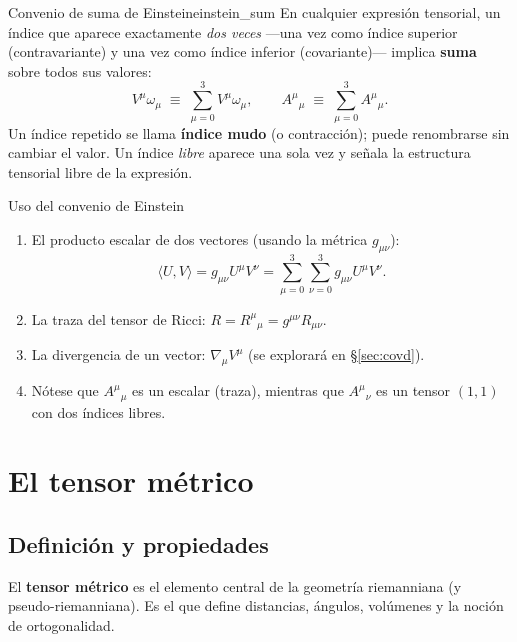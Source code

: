 \begin{definicion}{Convenio de suma de Einstein}{einstein_sum}
En cualquier expresión tensorial, un índice que aparece exactamente \emph{dos veces} ---una vez como índice superior (contravariante) y una vez como índice inferior (covariante)--- implica \textbf{suma} sobre todos sus valores:
\[
  V^\mu \omega_\mu \;\equiv\; \sum_{\mu=0}^{3} V^\mu \omega_\mu,
  \qquad
  A^\mu{}_{\mu} \;\equiv\; \sum_{\mu=0}^{3} A^\mu{}_\mu.
\]
Un índice repetido se llama \textbf{índice mudo} (o contracción); puede renombrarse sin cambiar el valor. Un índice \emph{libre} aparece una sola vez y señala la estructura tensorial libre de la expresión.
\end{definicion}

\begin{ejemplo}{Uso del convenio de Einstein}{}
\begin{enumerate}[leftmargin=2em, label=(\alph*)]
  \item El producto escalar de dos vectores (usando la métrica $g_{\mu\nu}$):
  \[
    \langle U, V\rangle = g_{\mu\nu} U^\mu V^\nu = \sum_{\mu=0}^{3}\sum_{\nu=0}^{3} g_{\mu\nu} U^\mu V^\nu.
  \]

  \item La traza del tensor de Ricci: $R = R^\mu{}_\mu = g^{\mu\nu}R_{\mu\nu}$.

  \item La divergencia de un vector: $\nabla_\mu V^\mu$ (se explorará en §\ref{sec:covd}).

  \item Nótese que $A^\mu{}_\mu$ es un escalar (traza), mientras que $A^\mu{}_\nu$ es un tensor $(1,1)$ con dos índices libres.
\end{enumerate}
\end{ejemplo}

\section{El tensor métrico}

\subsection{Definición y propiedades}

El \textbf{tensor métrico} es el elemento central de la geometría riemanniana (y pseudo-riemanniana). Es el que define distancias, ángulos, volúmenes y la noción de ortogonalidad.

